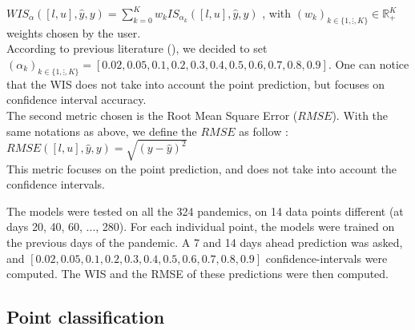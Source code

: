 $WIS_\alpha( [l, u], \hat{y}, y ) = \sum_{k=0}^{K} w_k IS_{\alpha_k}( [l, u], \hat{y}, y ) $ , with $(w_k)_{k \in \{1, \vdots , K\}} \in \mathbb{R}_+ ^K $ weights chosen by the user. \\

According to previous literature (\cite{cramer2022evaluation}), we decided to set $(\alpha_k)_{k \in \{1, \vdots , K\}} = [0.02, 0.05, 0.1, 0.2, 0.3, 0.4, 0.5, 0.6, 0.7, 0.8, 0.9]$. 
One can notice that the WIS does not take into account the point prediction, but focuses on confidence interval accuracy. \\

The second metric chosen is the Root Mean Square Error ($RMSE$). 
With the same notations as above, we define the $RMSE$ as follow : \\
$RMSE([l, u], \hat{y}, y) = \sqrt{(y-\hat{y})^2}$\\
This metric focuses on the point prediction, and does not take into account the confidence intervals. 


The models were tested on all the 324 pandemics, on 14 data points different (at days 20, 40, 60, ..., 280). 
For each individual point, the models were trained on the previous days of the pandemic. 
A 7 and 14 days ahead prediction was asked, and $[0.02, 0.05, 0.1, 0.2, 0.3, 0.4, 0.5, 0.6, 0.7, 0.8, 0.9]$ confidence-intervals were computed. 
The WIS and the RMSE of these predictions were then computed. 

\subsection{Point classification}
\label{sec:classification}

